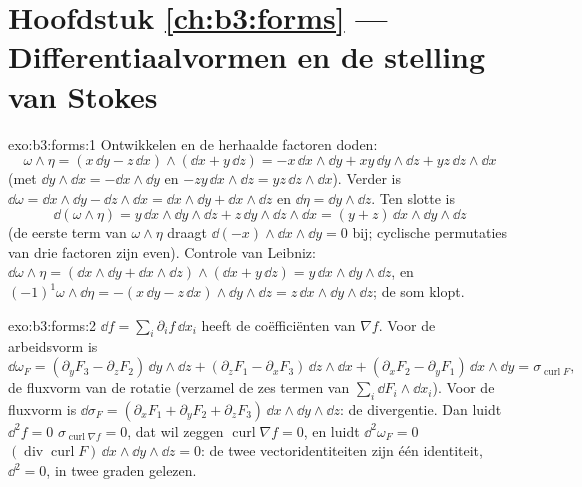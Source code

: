 \section*{Hoofdstuk \ref{ch:b3:forms} --- Differentiaalvormen en
de stelling van Stokes}

\begin{solution}{exo:b3:forms:1}
Ontwikkelen en de herhaalde factoren doden:
\[
\omega\wedge\eta = (x\,\dd y - z\,\dd x)\wedge(\dd x +
y\,\dd z)
= -x\,\dd x\wedge\dd y + xy\,\dd y\wedge\dd z +
yz\,\dd z\wedge\dd x
\]
(met $\dd y\wedge\dd x = -\dd x\wedge\dd y$ en $-zy\,\dd
x\wedge\dd z = yz\,\dd z\wedge\dd x$). Verder is $\dd\omega =
\dd x\wedge\dd y - \dd z\wedge\dd x = \dd x\wedge\dd y + \dd
x\wedge\dd z$ en $\dd\eta = \dd y\wedge\dd z$. Ten slotte is
\[
\dd(\omega\wedge\eta) = y\,\dd x\wedge\dd y\wedge\dd z +
z\,\dd y\wedge\dd z\wedge\dd x = (y + z)\,\dd x\wedge\dd
y\wedge\dd z
\]
(de eerste term van $\omega\wedge\eta$ draagt $\dd(-x)
\wedge\dd x\wedge\dd y = 0$ bij; cyclische permutaties van drie
factoren zijn even). Controle van Leibniz: $\dd\omega\wedge\eta =
(\dd x\wedge\dd y + \dd x\wedge\dd z)\wedge(\dd x + y\,\dd z) =
y\,\dd x\wedge\dd y\wedge\dd z$, en
$(-1)^1\omega\wedge\dd\eta = -(x\,\dd y - z\,\dd x)\wedge\dd
y\wedge\dd z = z\,\dd x\wedge\dd y\wedge\dd z$; de som klopt.
\end{solution}

\begin{solution}{exo:b3:forms:2}
$\dd f = \sum_i\partial_if\,\dd x_i$ heeft de coëfficiënten van
$\nabla f$. Voor de arbeidsvorm is
\[
\dd\omega_F = (\partial_yF_3 - \partial_zF_2)\,\dd y\wedge\dd
z + (\partial_zF_1 - \partial_xF_3)\,\dd z\wedge\dd x +
(\partial_xF_2 - \partial_yF_1)\,\dd x\wedge\dd y =
\sigma_{\operatorname{curl}F},
\]
de fluxvorm van de rotatie (verzamel de zes termen van
$\sum_i\dd F_i\wedge\dd x_i$). Voor de fluxvorm is $\dd\sigma_F =
(\partial_xF_1 + \partial_yF_2 + \partial_zF_3)\,\dd x\wedge\dd
y\wedge\dd z$: de divergentie. Dan luidt $\dd^2f = 0$
$\sigma_{\operatorname{curl}\nabla f} = 0$, dat wil zeggen
$\operatorname{curl}\nabla f = 0$, en luidt $\dd^2\omega_F = 0$
$(\operatorname{div}\operatorname{curl}F)\,\dd x\wedge\dd
y\wedge\dd z = 0$: de twee vectoridentiteiten zijn één identiteit,
$\dd^2 = 0$, in twee graden gelezen.
\end{solution}

